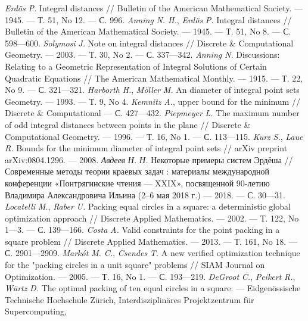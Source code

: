 \begin{thebibliography}{99}
\emph{Erdös} \emph{P.} Integral distances // Bulletin of the
American Mathematical Society. — 1945. — Т. 51, No 12. — С. 996.
\emph{Anning} \emph{N. H.}, \emph{Erdös} \emph{P.}
Integral distances // Bulletin of the American Mathematical
Society. — 1945. — Т. 51, No 8. — С. 598—600.
\emph{Solymosi} \emph{J.} Note on integral distances //
Discrete \& Computational Geometry. — 2003. — Т. 30, No 2. —
С. 337—342.
\emph{Anning} \emph{N.} Discussions: Relating to a Geometric
Representation of Integral Solutions of Certain Quadratic
Equations // The American Mathematical Monthly. — 1915. —
Т. 22, No 9. — С. 321—321.
\emph{Harborth} \emph{H.},
\emph{Möller} \emph{M.} An
diameter of integral point sets
Geometry. — 1993. — Т. 9, No 4.
\emph{Kemnitz} \emph{A.},
upper bound for the minimum
// Discrete \& Computational
— С. 427—432.
\emph{Piepmeyer} \emph{L.} The maximum number of odd
integral distances between points in the plane // Discrete \&
Computational Geometry. — 1996. — Т. 16, No 1. — С. 113—115.
\emph{Kurz} \emph{S.}, \emph{Laue} \emph{R.} Bounds for
the minimum diameter of integral point sets // arXiv preprint
arXiv:0804.1296. — 2008.
\emph{Авдеев} \emph{Н. Н.} Некоторые примеры систем
Эрдёша // Современные методы теории краевых задач :
материалы международной конференции «Понтрягинские
чтения — XXIX», посвященной 90-летию Владимира
Александровича Ильина (2–6 мая 2018 г.) — 2018. — С. 30—31.
\emph{Locatelli} \emph{M.}, \emph{Raber} \emph{U.} Packing
equal circles in a square: a deterministic global optimization
approach // Discrete Applied Mathematics. — 2002. — Т. 122,
No 1—3. — С. 139—166.
\emph{Costa} \emph{A.} Valid constraints for the point packing
in a square problem // Discrete Applied Mathematics. — 2013. —
Т. 161, No 18. — С. 2901—2909.
\emph{Markót} \emph{M. C.}, \emph{Csendes} \emph{T.} A
new verified optimization technique for the "packing circles in
a unit square" problems // SIAM Journal on Optimization. —
2005. — Т. 16, No 1. — С. 193—219.
\emph{DeGroot} \emph{C.}, \emph{Peikert} \emph{R.},
\emph{Würtz} \emph{D.} The optimal packing of ten equal
circles in a square. — Eidgenössische Technische Hochschule
Zürich, Interdisziplinäres Projektzentrum für Supercomputing,

\end{thebibliography}
